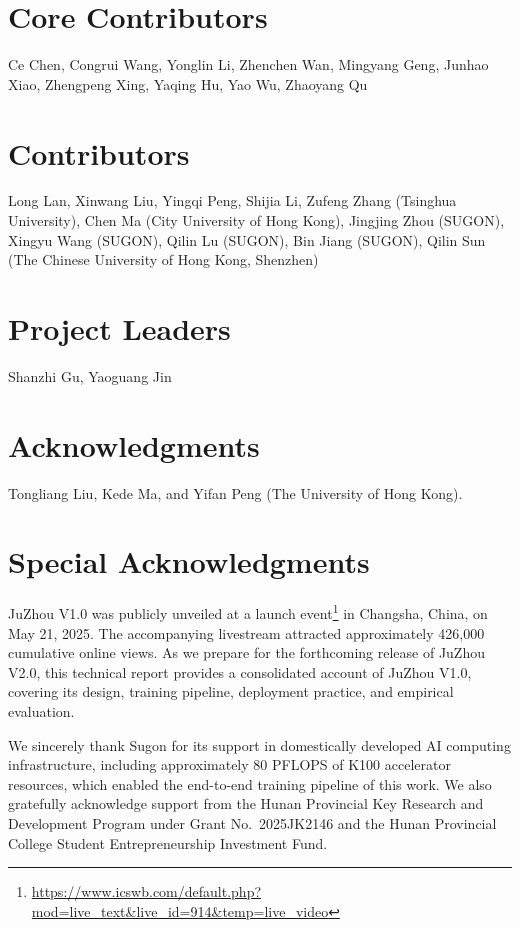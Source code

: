 \section*{Core Contributors}
Ce Chen, Congrui Wang, Yonglin Li, Zhenchen Wan, Mingyang Geng, Junhao Xiao, Zhengpeng Xing, Yaqing Hu, Yao Wu, Zhaoyang Qu

\section*{Contributors}
Long Lan, Xinwang Liu, Yingqi Peng, Shijia Li, Zufeng Zhang (Tsinghua University), Chen Ma (City University of Hong Kong), Jingjing Zhou (SUGON), Xingyu Wang (SUGON), Qilin Lu (SUGON), Bin Jiang (SUGON), Qilin Sun (The Chinese University of Hong Kong, Shenzhen)

\section*{Project Leaders}
Shanzhi Gu, Yaoguang Jin

\section*{Acknowledgments}
Tongliang Liu, Kede Ma, and Yifan Peng (The University of Hong Kong).

\section*{Special Acknowledgments}
JuZhou V1.0 was publicly unveiled at a launch event\footnote{\url{https://www.icswb.com/default.php?mod=live_text&live_id=914&temp=live_video}}  in Changsha, China, on May 21, 2025. The accompanying livestream attracted approximately 426,000 cumulative online views. As we prepare for the forthcoming release of JuZhou V2.0, this technical report provides a consolidated account of JuZhou V1.0, covering its design, training pipeline, deployment practice, and empirical evaluation.

We sincerely thank Sugon for its support in domestically developed AI computing infrastructure, including approximately 80 PFLOPS of K100 accelerator resources, which enabled the end-to-end training pipeline of this work. We also gratefully acknowledge support from the Hunan Provincial Key Research and Development Program under Grant No.~2025JK2146 and the Hunan Provincial College Student Entrepreneurship Investment Fund.

